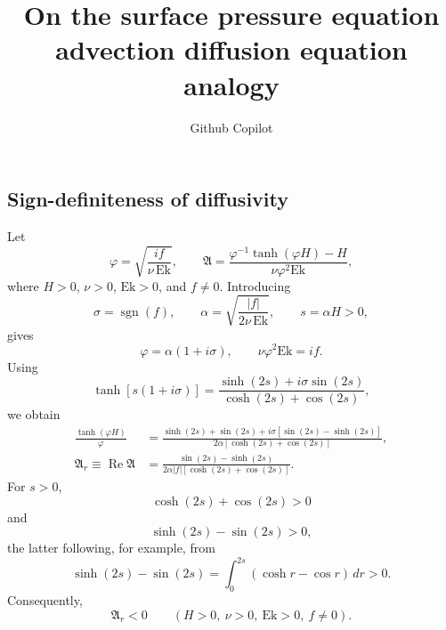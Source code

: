 \documentclass[10pt]{amsart}
\title{On the surface pressure equation advection diffusion equation analogy}
\author{Github Copilot}
\date{}                                           %
\begin{document}
\maketitle
\subsection{Sign-definiteness of diffusivity}

Let
\begin{equation}
\varphi=\sqrt{\frac{i f}{\nu\,\mathrm{Ek}}},
\qquad
\mathfrak A
=
\frac{\varphi^{-1}\tanh(\varphi H)-H}{\nu \varphi^2\mathrm{Ek}},
\end{equation}
where \(H>0\), \(\nu>0\), \(\mathrm{Ek}>0\), and \(f \neq 0\).
Introducing
\begin{equation}
\sigma=\operatorname{sgn}(f),
\qquad
\alpha=\sqrt{\frac{|f|}{2\nu\,\mathrm{Ek}}},
\qquad
s=\alpha H>0,
\end{equation}
gives
\begin{equation}
\varphi=\alpha(1+i\sigma),
\qquad
\nu \varphi^2\mathrm{Ek}=if.
\end{equation}
Using
\begin{equation}
\tanh\!\left[s(1+i\sigma)\right]
=
\frac{\sinh(2s)+i\sigma\sin(2s)}
     {\cosh(2s)+\cos(2s)},
\end{equation}
we obtain
\begin{align}
\frac{\tanh(\varphi H)}{\varphi}
&=
\frac{
\sinh(2s)+\sin(2s)
+i\sigma\left[\sin(2s)-\sinh(2s)\right]
}{
2\alpha\left[\cosh(2s)+\cos(2s)\right]
},
\\
\mathfrak A_r
\equiv \operatorname{Re}\mathfrak A
&=
\frac{\sin(2s)-\sinh(2s)}
{
2\alpha |f|
\left[\cosh(2s)+\cos(2s)\right]
}.
\end{align}
For \(s>0\),
\begin{equation}
\cosh(2s)+\cos(2s)>0
\end{equation}
and
\begin{equation}
\sinh(2s)-\sin(2s)>0,
\end{equation}
the latter following, for example, from
\begin{equation}
\sinh(2s)-\sin(2s)
=
\int_0^{2s}\left(\cosh r-\cos r\right)\,dr>0.
\end{equation}
Consequently,
\begin{equation}
\boxed{\mathfrak A_r<0}
\qquad
(H>0,\ \nu>0,\ \mathrm{Ek}>0,\ f\neq0).
\end{equation}
\end{document}
